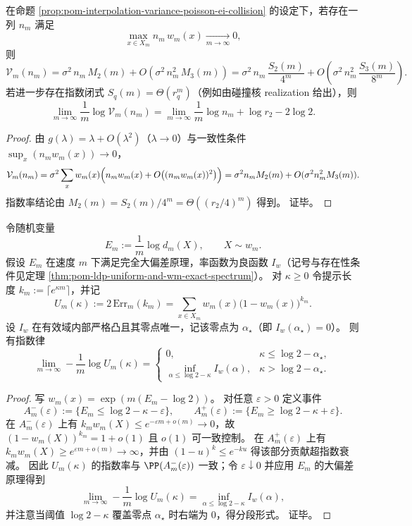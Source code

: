 \begin{corollary}\label{cor:pom-subcritical-occupancy-variance-second-order}
在命题 \ref{prop:pom-interpolation-variance-poisson-ei-collision} 的设定下，若存在一列 \(n_m\) 满足
\[
\max_{x\in X_m} n_m\,w_m(x)\xrightarrow[m\to\infty]{}0,
\]
则
\[
\mathcal V_m(n_m)
=\sigma^2\,n_m\,M_2(m)+O\!\left(\sigma^2\,n_m^2\,M_3(m)\right)
=\sigma^2\,n_m\,\frac{S_2(m)}{4^m}+O\!\left(\sigma^2\,n_m^2\,\frac{S_3(m)}{8^m}\right).
\]
若进一步存在指数闭式 \(S_q(m)=\Theta(r_q^m)\)（例如由碰撞核 realization 给出），则
\[
\lim_{m\to\infty}\frac1m\log \mathcal V_m(n_m)
=\lim_{m\to\infty}\frac1m\log n_m+\log r_2-2\log 2.
\]
\end{corollary}

\begin{proof}
由 \(g(\lambda)=\lambda+O(\lambda^2)\)（\(\lambda\to0\)）与一致性条件 \(\sup_x(n_m w_m(x))\to0\)，
\[
\mathcal V_m(n_m)=\sigma^2\sum_x w_m(x)\Bigl(n_mw_m(x)+O\bigl((n_mw_m(x))^2\bigr)\Bigr)
=\sigma^2n_mM_2(m)+O(\sigma^2n_m^2M_3(m)).
\]
指数率结论由 \(M_2(m)=S_2(m)/4^m=\Theta((r_2/4)^m)\) 得到。
证毕。
\end{proof}

\begin{theorem}\label{thm:pom-icl-exponential-prompt-phase-transition}
令随机变量
\[
E_m:=\frac1m\log d_m(X),\qquad X\sim w_m.
\]
假设 \(E_m\) 在速度 \(m\) 下满足完全大偏差原理，率函数为良函数 \(I_w\)（记号与存在性条件见定理 \ref{thm:pom-ldp-uniform-and-wm-exact-spectrum}）。
对 \(\kappa\ge 0\) 令提示长度 \(k_m:=\lceil e^{\kappa m}\rceil\)，并记
\[
U_m(\kappa):=2\,\mathrm{Err}_m(k_m)=\sum_{x\in X_m}w_m(x)\bigl(1-w_m(x)\bigr)^{k_m}.
\]
设 \(I_w\) 在有效域内部严格凸且其零点唯一，记该零点为 \(\alpha_\star\)（即 \(I_w(\alpha_\star)=0\)）。
则有指数律
\[
\lim_{m\to\infty}-\frac1m\log U_m(\kappa)
=
\begin{cases}
0, & \kappa\le \log 2-\alpha_\star,\\[4pt]
\displaystyle \inf_{\alpha\le \log 2-\kappa} I_w(\alpha), & \kappa>\log 2-\alpha_\star.
\end{cases}
\]
\end{theorem}

\begin{proof}
写 \(w_m(x)=\exp(m(E_m-\log2))\)。
对任意 \(\varepsilon>0\) 定义事件
\[
A_m^-(\varepsilon):=\{E_m\le \log2-\kappa-\varepsilon\},\qquad
A_m^+(\varepsilon):=\{E_m\ge \log2-\kappa+\varepsilon\}.
\]
在 \(A_m^-(\varepsilon)\) 上有 \(k_mw_m(X)\le e^{-\varepsilon m+o(m)}\to0\)，故
\(
(1-w_m(X))^{k_m}=1+o(1)
\)
且 \(o(1)\) 可一致控制。
在 \(A_m^+(\varepsilon)\) 上有 \(k_mw_m(X)\ge e^{\varepsilon m+o(m)}\to\infty\)，并由 \((1-u)^k\le e^{-ku}\) 得该部分贡献超指数衰减。
因此 \(U_m(\kappa)\) 的指数率与 \(\PP(A_m^-(\varepsilon))\) 一致；令 \(\varepsilon\downarrow0\) 并应用 \(E_m\) 的大偏差原理得到
\[
\lim_{m\to\infty}-\frac1m\log U_m(\kappa)=\inf_{\alpha\le \log2-\kappa}I_w(\alpha),
\]
并注意当阈值 \(\log2-\kappa\) 覆盖零点 \(\alpha_\star\) 时右端为 \(0\)，得分段形式。
证毕。
\end{proof}

